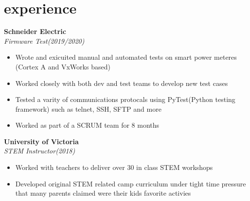 \documentclass{article}
\newcommand{\minicolumns}[2]{
  \begin{minipage}[t]{0.25\textwidth}
    \begin{flushright}
      #1
    \end{flushright}
  \end{minipage}
  \hfill    
  \begin{minipage}[t]{0.7\textwidth}
    #2
  \end{minipage}   
}
\newcommand{\resumeSection}[3]{
  \minicolumns{
      \textbf{#1}\\          
      \textit{#2}
    }
    {  
      \begin{itemize}[leftmargin=*]
          \setlength\itemsep{-0.1em}
          #3
      \end{itemize}
  }
  \vspace{1em}
}
\begin{document}
\section{experience}
\resumeSection{Schneider Electric}{Firmware Test(2019/2020)}{
  \item Wrote and exicuited manual and automated tests on smart power meteres (Cortex A and VxWorks based)
  \item Worked closely with both dev and test teams to develop new test cases
  \item Tested a varity of communications protocals using PyTest(Python testing framework) such as telnet, SSH, SFTP and more
  \item Worked as part of a SCRUM team for 8 months
}

\resumeSection{University of Victoria}{STEM Instructor(2018)}{
  \item Worked with teachers to deliver over 30 in class STEM workshops
  \item Developed original STEM related camp curriculum under tight time pressure 
  that many parents claimed were their kids favorite activies
}
\end{document}
